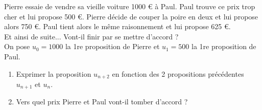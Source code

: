 \documentclass[11pt]{article}
\begin{document}
\begin{exercice}[6][Négociation]
Pierre essaie de vendre sa vieille voiture 1000 € à Paul. Paul trouve
ce prix trop cher et lui propose 500 €. Pierre décide de couper la
poire en deux et lui propose alors 750 €. Paul tient alors le même raisonnement et lui propose 625 €. \\
Et ainsi de suite... Vont-il finir par se mettre d’accord ? \\
On pose $u_0 = 1000$ la 1re proposition de Pierre et $u_1 = 500$ la
1re proposition de Paul.
\begin{enumerate}
\item Exprimer la proposition $u_{n+2}$ en fonction des 2 propositions précédentes $u_{n+1}$ et $u_n$.
\item Vers quel prix Pierre et Paul vont-il tomber d’accord ?
\end{enumerate}
\end{exercice}
\end{document}
